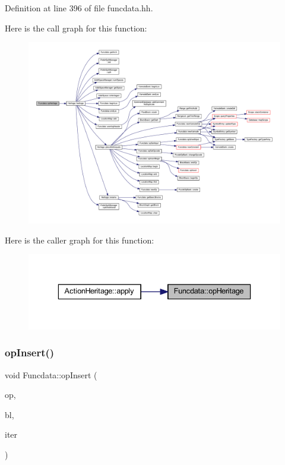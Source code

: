 Definition at line 396 of file funcdata.\+hh.

Here is the call graph for this function\+:
\nopagebreak
\begin{figure}[H]
\begin{center}
\leavevmode
\includegraphics[width=350pt]{class_funcdata_a99d243f1e771d6e220330feb534a3fee_cgraph}
\end{center}
\end{figure}
Here is the caller graph for this function\+:
\nopagebreak
\begin{figure}[H]
\begin{center}
\leavevmode
\includegraphics[width=336pt]{class_funcdata_a99d243f1e771d6e220330feb534a3fee_icgraph}
\end{center}
\end{figure}
\mbox{\label{class_funcdata_a6b77ee6442d79ae754d5dcf0b5318fca}} 
\subsubsection{\texorpdfstring{opInsert()}{opInsert()}}
{\footnotesize\ttfamily void Funcdata\+::op\+Insert (\begin{DoxyParamCaption}\item[{\mbox{\hyperlink{class_pcode_op}{Pcode\+Op}} $\ast$}]{op,  }\item[{\mbox{\hyperlink{class_block_basic}{Block\+Basic}} $\ast$}]{bl,  }\item[{list$<$ \mbox{\hyperlink{class_pcode_op}{Pcode\+Op}} $\ast$ $>$\+::iterator}]{iter }\end{DoxyParamCaption})}



